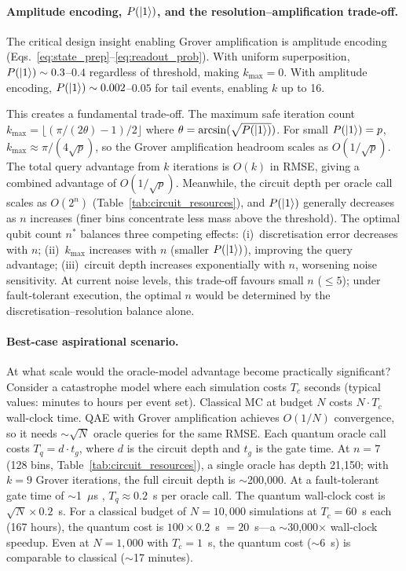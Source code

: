 \documentclass[11pt,a4paper]{article}
\begin{document}
\paragraph{Amplitude encoding, $P(\ket{1})$, and the resolution--amplification trade-off.} The critical design insight enabling Grover amplification is amplitude encoding (Eqs.~\ref{eq:state_prep}--\ref{eq:readout_prob}). With uniform superposition, $P(\ket{1}) \sim 0.3$--$0.4$ regardless of threshold, making $k_{\max} = 0$. With amplitude encoding, $P(\ket{1}) \sim 0.002$--$0.05$ for tail events, enabling $k$ up to 16.

This creates a fundamental trade-off. The maximum safe iteration count $k_{\max} = \lfloor(\pi/(2\theta) - 1)/2\rfloor$ where $\theta = \arcsin(\sqrt{P(\ket{1})})$. For small $P(\ket{1}) = p$, $k_{\max} \approx \pi/(4\sqrt{p})$, so the Grover amplification headroom scales as $O(1/\sqrt{p})$. The total query advantage from $k$ iterations is $O(k)$ in RMSE, giving a combined advantage of $O(1/\sqrt{p})$. Meanwhile, the circuit depth per oracle call scales as $O(2^n)$ (Table~\ref{tab:circuit_resources}), and $P(\ket{1})$ generally decreases as $n$ increases (finer bins concentrate less mass above the threshold). The optimal qubit count $n^*$ balances three competing effects: (i)~discretisation error decreases with $n$; (ii)~$k_{\max}$ increases with $n$ (smaller $P(\ket{1})$), improving the query advantage; (iii)~circuit depth increases exponentially with $n$, worsening noise sensitivity. At current noise levels, this trade-off favours small $n$ ($\leq 5$); under fault-tolerant execution, the optimal $n$ would be determined by the discretisation--resolution balance alone.

\paragraph{Best-case aspirational scenario.} At what scale would the oracle-model advantage become practically significant? Consider a catastrophe model where each simulation costs $T_c$ seconds (typical values: minutes to hours per event set). Classical MC at budget $N$ costs $N \cdot T_c$ wall-clock time. QAE with Grover amplification achieves $O(1/N)$ convergence, so it needs $\sim\!\sqrt{N}$ oracle queries for the same RMSE. Each quantum oracle call costs $T_q = d \cdot t_g$, where $d$ is the circuit depth and $t_g$ is the gate time. At $n=7$ (128 bins, Table~\ref{tab:circuit_resources}), a single oracle has depth 21,150; with $k=9$ Grover iterations, the full circuit depth is $\sim$200,000. At a fault-tolerant gate time of $\sim$1~$\mu$s \cite{Reiher2017}, $T_q \approx 0.2$~s per oracle call. The quantum wall-clock cost is $\sqrt{N} \times 0.2$~s. For a classical budget of $N = 10{,}000$ simulations at $T_c = 60$~s each (167 hours), the quantum cost is $100 \times 0.2$~s $= 20$~s---a $\sim$30,000$\times$ wall-clock speedup. Even at $N = 1{,}000$ with $T_c = 1$~s, the quantum cost ($\sim$6~s) is comparable to classical ($\sim$17 minutes).
\end{document}
